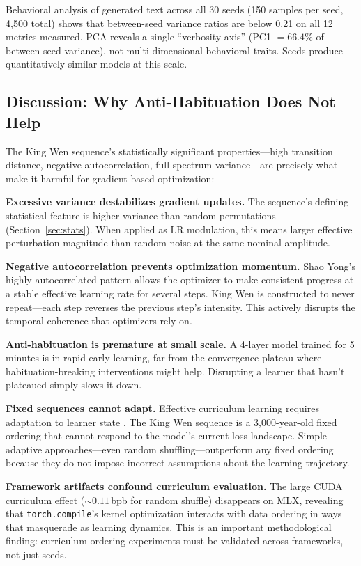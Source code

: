 \documentclass{article}
\begin{document}
Behavioral analysis of generated text across all 30 seeds (150 samples per seed, 4,500 total) shows that between-seed variance ratios are below 0.21 on all 12 metrics measured. PCA reveals a single ``verbosity axis'' (PC1 $= 66.4\%$ of between-seed variance), not multi-dimensional behavioral traits. Seeds produce quantitatively similar models at this scale.

\subsection{Discussion: Why Anti-Habituation Does Not Help}

The King Wen sequence's statistically significant properties---high transition distance, negative autocorrelation, full-spectrum variance---are precisely what make it harmful for gradient-based optimization:

\textbf{Excessive variance destabilizes gradient updates.} The sequence's defining statistical feature is higher variance than random permutations (Section~\ref{sec:stats}). When applied as LR modulation, this means larger effective perturbation magnitude than random noise at the same nominal amplitude.

\textbf{Negative autocorrelation prevents optimization momentum.} Shao Yong's highly autocorrelated pattern allows the optimizer to make consistent progress at a stable effective learning rate for several steps. King Wen is constructed to never repeat---each step reverses the previous step's intensity. This actively disrupts the temporal coherence that optimizers rely on.

\textbf{Anti-habituation is premature at small scale.} A 4-layer model trained for 5 minutes is in rapid early learning, far from the convergence plateau where habituation-breaking interventions might help. Disrupting a learner that hasn't plateaued simply slows it down.

\textbf{Fixed sequences cannot adapt.} Effective curriculum learning requires adaptation to learner state \cite{graves2017automated}. The King Wen sequence is a 3,000-year-old fixed ordering that cannot respond to the model's current loss landscape. Simple adaptive approaches---even random shuffling---outperform any fixed ordering because they do not impose incorrect assumptions about the learning trajectory.

\textbf{Framework artifacts confound curriculum evaluation.} The large CUDA curriculum effect (${\sim}0.11$\,bpb for random shuffle) disappears on MLX, revealing that \texttt{torch.compile}'s kernel optimization interacts with data ordering in ways that masquerade as learning dynamics. This is an important methodological finding: curriculum ordering experiments must be validated across frameworks, not just seeds.
\end{document}
